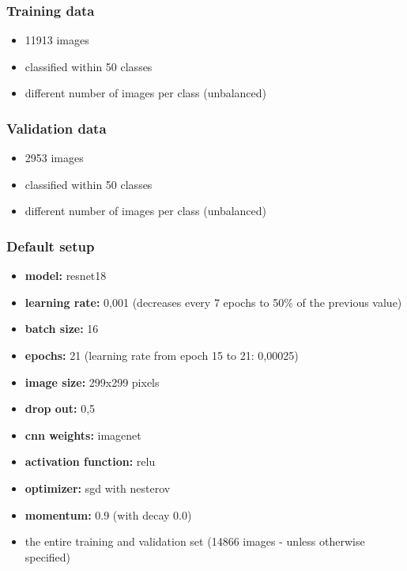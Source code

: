 \documentclass[10pt]{article}
\newif\ifen
\newif\ifde
\newcommand{\en}[1]{\ifen#1\fi}
\newcommand{\de}[1]{\ifde#1\fi}
\begin{document}
			\subsubsection*{Training data}
				\begin{itemize}
					\item 11913 images
					\item classified within 50 classes
					\item different number of images per class (unbalanced)
				\end{itemize}
			
			\subsubsection*{Validation data}
				\begin{itemize}
					\item 2953 images
					\item classified within 50 classes
					\item different number of images per class (unbalanced)
				\end{itemize}
				
			\subsubsection*{Default setup}
				\de{Mit Ausnahme der CNN-Modellversuche basierten alle Tests auf den folgenden Parametern (wobei ein Wert der Parameter je nach Kapitel variierte):}
				\en{With the exception of the cnn model tests, all tests were based on the following parameters
			(whereby one value of the parameters varied depending on the chapter):}
		
				\begin{itemize}
					\item \textbf{model:} resnet18
					\item \textbf{learning rate:} 0,001 (decreases every 7 epochs to 50\% of the previous value)
					\item \textbf{batch size:} 16
					\item \textbf{epochs:} 21 (learning rate from epoch 15 to 21: 0,00025)
					\item \textbf{image size:} 299x299 pixels
					\item \textbf{drop out:} 0,5
					\item \textbf{cnn weights:} imagenet
					\item \textbf{activation function:} relu
					\item \textbf{optimizer:} sgd with nesterov
					\item \textbf{momentum:} 0.9 (with decay 0.0)
					\item the entire training and validation set (14866 images - unless otherwise specified)
				\end{itemize}
				
\end{document}
